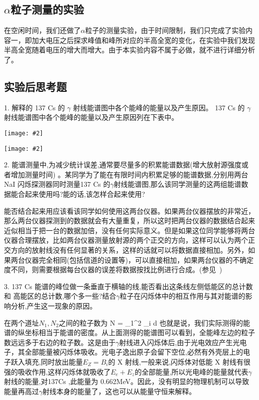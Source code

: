 \documentclass[11pt,a4paper]{ctexart}
\newcommand{\cpic}[2]{
\begin{center}
\texttt{[image: \#2]}
\end{center}
}
\begin{document}
\subsection{$\alpha$粒子测量的实验}
在空闲时间，我们还做了$\alpha$粒子的测量实验，由于时间限制，我们只完成了实验内容一，即加大电压之后探求峰值和峰所对应的半高全宽的变化，在实验中我们发现半高全宽随着电压的增大而增大。由于本实验内容不属于必做，就不进行详细分析了。

  
\subsection{实验后思考题}
1. 解释的 137 Cs 的 $\gamma$ 射线能谱图中各个能峰的能量以及产生原因。
 137 Cs 的 $\gamma$ 射线能谱图中各个能峰的能量以及产生原因列在下表中。
 \begin{table}[H]
  \cpic{0.5}{6-2-1}
  \cpic{0.5}{6-2-2}
  \label{cause}
\end{table}

2. 能谱测量中,为减少统计误差,通常要尽量多的积累能谱数据(增大放射源强度或
者增加测量时间)
。某同学为了能在有限时间内积累足够的能谱数据,分别用两台
NaI 闪烁探测器同时测量137 Cs
的$\gamma$射线能谱图,那么该同学测量的这两组能谱数据能合起来使用吗?能的话,该怎样合起来使用?

能否结合起来用应该看该同学如何使用这两台仪器。如果两台仪器摆放的非常近，那么两台仪器探测到的数据就会有大量重复，所以这时把两台仪器的数据结合起来近似相当于把一台的数据加倍，没有任何实际意义。但是如果这位同学能够将两台仪器合理摆放，比如两台仪器测量放射源的两个正交的方向，这样可以认为两个正交方向的放射线没有任何显著的关系，这样的话就可以将数据直接相加。另外，如果两台仪器完全相同(包括信道的设置等)，可以直接相加，如果两台仪器的不确定度不同，则需要根据每台仪器的误差将数据按找比例进行合成。(参见~\cite{error})

3.
137 Cs
能谱的峰位做一条垂直于横轴的线,能否看出这条线左侧低能区的总计数和
高能区的总计数,哪个多一些?结合$\gamma$粒子在闪烁体中的相互作用与其对能谱的影响分析,产生这一现象的原因。

在两个道址$N_1,N_2$之间的粒子数为
\beq
\Delta N = \sum_1^{2} \rho_i \Delta d
\eeq
也就是说，我们实际测得的能谱的纵坐标相当于能谱的密度。从上面测得的能谱图可以看到，全能峰左边的粒子数远远多于右边的粒子数。这是由于$\gamma$射线进入闪烁体后,由于光电效应产生光电子，其全部能量被闪烁体吸收。光电子逸出原子会留下空位,必然有外壳层上的电子跃入填充,同时放出能量$E_Z = B_i$的 X 射线,一般来说,闪烁体对低能 X 射线有很强的吸收作用,这样闪烁体就吸收了$E_e+E_z$的全部能量,所以光电峰的能量就代表$\gamma$射线的能量,对137Cs ,此能量为 0.662MeV。因此，没有明显的物理机制可以导致能量再高过$\gamma$射线本身的能量了，这也可以从能量守恒来解释。
\end{document}
